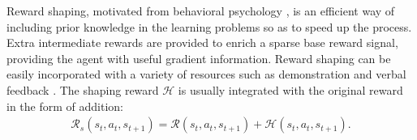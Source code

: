 \documentclass[letterpaper]{article} %
\begin{document}
Reward shaping, motivated from behavioral psychology \cite{behavior}, is an efficient way of including prior knowledge in the learning problems so as to speed up the process. Extra intermediate rewards are provided to enrich a sparse base reward signal, providing the agent with useful gradient information. Reward shaping can be easily incorporated with a variety of resources such as demonstration \cite{rsdemo} and verbal feedback \cite{rsdemo}. The shaping reward $\mathcal{H}$ is usually integrated with the original reward in the form of addition:
\begin{align}
\mathcal{R}_s(s_t,a_t,s_{t+1}) = \mathcal{R}(s_t,a_t,s_{t+1})+\mathcal{H}(s_t,a_t,s_{t+1}).
\end{align}


\end{document}
